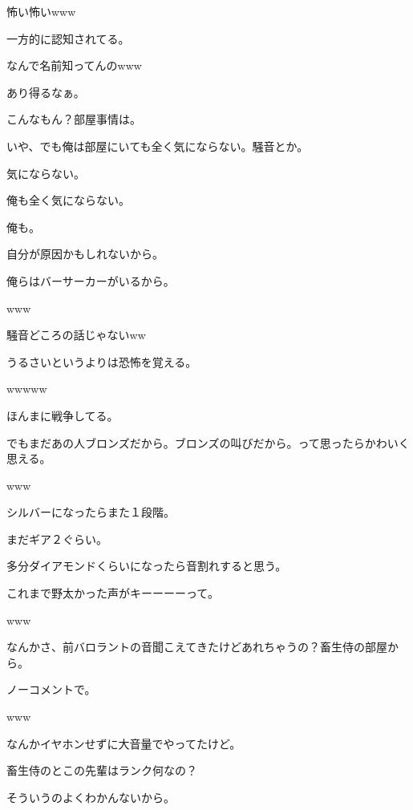 \begin{multicols}{2}
  
怖い怖いwww

  
一方的に認知されてる。

  
なんで名前知ってんのwww

  
あり得るなぁ。

  
こんなもん？部屋事情は。

  
いや、でも俺は部屋にいても全く気にならない。騒音とか。

  
気にならない。

  
俺も全く気にならない。

  
俺も。

  
自分が原因かもしれないから。
  
俺らはバーサーカーがいるから。

  
www

  
騒音どころの話じゃないww

  
うるさいというよりは恐怖を覚える。

  
wwwww

  
ほんまに戦争してる。

  
でもまだあの人ブロンズだから。ブロンズの叫びだから。って思ったらかわいく思える。

  
www

  
シルバーになったらまた１段階。

  
まだギア２ぐらい。

  
多分ダイアモンドくらいになったら音割れすると思う。

  
これまで野太かった声がキーーーーって。

  
www

  
なんかさ、前バロラントの音聞こえてきたけどあれちゃうの？{\textgt 畜生侍}の部屋から。

  
ノーコメントで。

  
www

  
なんかイヤホンせずに大音量でやってたけど。

  
畜生侍のとこの先輩はランク何なの？

  
そういうのよくわかんないから。


\end{multicols}
